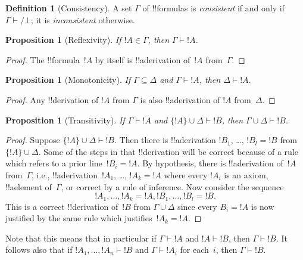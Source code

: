 \documentclass[10pt,a4paper]{article}
\theoremstyle{plain}
\newtheorem{prop}[thm]{Proposition}
\theoremstyle{definition}
\newtheorem{defn}[thm]{Definition}
\theoremstyle{remark}
\newcommand*{\ollabel}[1]{\label{#1}}
\providecommand{\lfalse}{\bot}
\providecommand{\Proves}{\mathrel{\vdash}}
\begin{document}
\begin{defn}[Consistency]
A set $\Gamma$ of !!{formula}s is \emph{consistent} if and only if
$\Gamma\Proves/ \lfalse$; it is \emph{inconsistent} otherwise.
\end{defn}

\begin{prop}[Reflexivity]
\ollabel{prop:reflexivity}
If $!A \in \Gamma$, then $\Gamma \Proves !A$.
\end{prop}

\begin{proof}
  The !!{formula}~$!A$ by itself is !!a{derivation} of~$!A$ from~$\Gamma$.
\end{proof}

\begin{prop}[Monotonicity]
\ollabel{prop:monotonicity}
If $\Gamma \subseteq \Delta$ and $\Gamma \Proves !A$, then $\Delta
\Proves !A$.
\end{prop}

\begin{proof}
Any !!{derivation} of $!A$ from $\Gamma$ is also !!a{derivation} of
$!A$ from~$\Delta$.
\end{proof}

\begin{prop}[Transitivity]
\ollabel{prop:transitivity}
If $\Gamma \Proves !A$ and $\{!A\} \cup \Delta \Proves
!B$, then $\Gamma \cup \Delta \Proves !B$.
\end{prop}

\begin{proof}
  Suppose $\{!A\} \cup \Delta \Proves !B$. Then there is
  !!a{derivation} $!B_1$, \dots, $!B_l = !B$ from~$\{!A\} \cup
  \Delta$. Some of the steps in that !!{derivation} will be correct
  because of a rule which refers to a prior line~$!B_i = !A$. By
  hypothesis, there is !!a{derivation} of~$!A$ from~$\Gamma$, i.e.,
  !!a{derivation}~$!A_1$, \dots, $!A_k = !A$ where every $!A_i$ is an
  axiom, !!a{element} of~$\Gamma$, or correct by a rule of
  inference. Now consider the sequence
  \[
  !A_1, \dots, !A_k = !A, !B_1, \dots, !B_l = !B.
  \]
  This is a correct !!{derivation} of~$!B$ from $\Gamma \cup \Delta$
  since every $B_i = !A$ is now justified by the same rule which
  justifies~$!A_k = !A$.
\end{proof}

Note that this means that in particular if $\Gamma \Proves !A$ and $!A
\Proves !B$, then $\Gamma \Proves !B$. It follows also that if $!A_1,
\dots, !A_n \Proves !B$ and $\Gamma \Proves !A_i$ for each~$i$, then
$\Gamma \Proves !B$.
\end{document}
